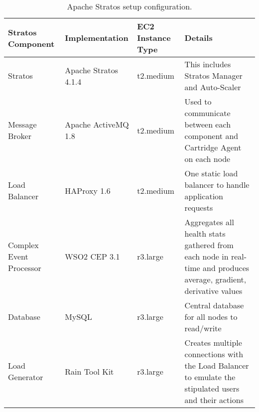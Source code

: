 \begin{table}[h!]
\centering
\caption{Apache Stratos setup configuration.}
\label{tab:stratos_config}
    \begin{tabular}{ | p{1cm} | p{2cm} | p{1cm}| p{3cm}|}
    \hline
    Stratos Component & Implementation & EC2 Instance Type & Details \\ \hline
    Stratos & Apache Stratos 4.1.4 & t2.medium & This includes Stratos Manager and Auto-Scaler \\ \hline
    
    Message Broker & Apache ActiveMQ 1.8 & t2.medium & Used to communicate between each component and Cartridge Agent on each node \\ \hline
    
    Load Balancer & HAProxy 1.6 & t2.medium & One static load balancer to handle application requests \\ \hline
    
    Complex Event Processor & WSO2 CEP 3.1 & r3.large & Aggregates all health stats gathered from each node in real-time and produces average, gradient, derivative values \\    \hline
    
    Database & MySQL & r3.large & Central database for all nodes to read/write \\    \hline
    
    Load Generator & Rain Tool Kit & r3.large & Creates multiple connections with the Load Balancer to emulate the stipulated users and their actions \\    \hline
    \end{tabular}
    
\end{table}